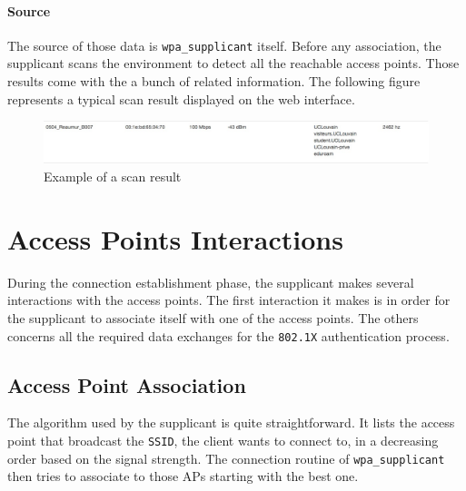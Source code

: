 \paragraph*{Source} The source of those data is \texttt{wpa\_supplicant} itself. Before any association, the supplicant scans the environment to detect all the reachable access points. Those results come with the a bunch of related information. The following figure represents a typical scan result displayed on the web interface.

\begin{figure}[H]
	\centering
   \includegraphics[width=1\textwidth]{Pictures/chapter6/scan-result.jpg}
   \caption{Example of a scan result}
\end{figure} 


\section{Access Points Interactions}
During the connection establishment phase, the supplicant makes several interactions with the access points. The first interaction it makes is in order for the supplicant to associate itself with one of the access points. The others concerns all the required data exchanges for the \texttt{802.1X} authentication process.

\subsection{Access Point Association}
The algorithm used by the supplicant is quite straightforward. It lists the access point that broadcast the \texttt{SSID}, the client wants to connect to, in a decreasing order based on the signal strength. The connection routine of \texttt{wpa\_supplicant} then tries to associate to those APs starting with the best one.

